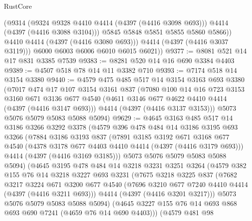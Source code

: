 \begin{lexlean}{RustCore}
\begin{coremodule}
                (@9314
                  (@9324 @9328 @4410 @4414 (@4397 (@4416 @3098 @693)))
                  @4414
                  (@4397 (@4416 @3088 @3104)))
                @5845
                @5848
                @5851
                @5855
                @5860
                @5866))
            @4410
            @4414
            (@4397 (@4416 @3080 @693)))
          @4414
          (@4397 (@4416 @3037 @3119)))
        @6000
        @6003
        @6006
        @6010
        @6015
        @6021))
@9377 := @8081 @521 @14 @17 @831 @3385 @7539
@9383 := @8281 @520 @14 @16 @690 @3384 @4403
@9389 := @4507 @518 @78 @14 @11 @3382 @710
@9393 := @7174 @518 @14 @3154 @3380
@9440 := @4579
    @475
    @485
    @517
    @14
    @3154
    @3163
    @693
    @3380
    (@7017
      @474
      @17
      @107
      @3154
      @3161
      @837
      (@7080
        @100
        @14
        @16
        @723
        @3153
        @3160
        @671
        @3136
        @677
        @4540
        (@4611 @3146 @677 @4622 @4410 @4414 (@4397 (@4416 @3147 @693)))
        @4414
        (@4397 (@4416 @3137 @3153)))
      @5073
      @5076
      @5079
      @5083
      @5088
      @5094)
@9629 := @4645
    @3163
    @485
    @517
    @14
    @3186
    @3266
    @3292
    @3378
    (@4579
      @396
      @478
      @484
      @14
      @3186
      @3195
      @693
      @3266
      (@7884
        @3186
        @3193
        @837
        (@7891
          @3185
          @3192
          @671
          @3168
          @677
          @4540
          (@4378 @3178 @677 @4403 @4410 @4414 (@4397 (@4416 @3179 @693)))
          @4414
          (@4397 (@4416 @3169 @3185)))
        @5073
        @5076
        @5079
        @5083
        @5088
        @5094)
      (@4645
        @3195
        @478
        @484
        @14
        @3218
        @3231
        @3251
        @3264
        (@4579
          @382
          @155
          @76
          @14
          @3218
          @3227
          @693
          @3231
          (@7675
            @3218
            @3225
            @837
            (@7682
              @3217
              @3224
              @671
              @3200
              @677
              @4540
              (@7696 @3210 @677 @7240 @4410 @4414 (@4397 (@4416 @3211 @693)))
              @4414
              (@4397 (@4416 @3201 @3217)))
            @5073
            @5076
            @5079
            @5083
            @5088
            @5094)
          (@4645 @3227 @155 @76 @14 @693 @868 @693 @690 @7241 (@4659 @76 @14 @690 @4403)))
        (@4579
          @481
          @98

\end{coremodule}
\end{lexlean}
